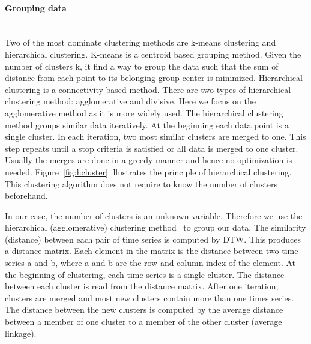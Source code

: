 \paragraph{Grouping data} ~\\
Two of the most dominate clustering methods are k-means clustering and hierarchical clustering. K-means is a centroid based grouping method. Given the number of clusters k, it find a way to group the data such that the sum of distance from each point to its belonging group center is minimized. Hierarchical clustering is a connectivity based method. There are two types of hierarchical clustering method: agglomerative and divisive. Here we focus on the agglomerative method as it is more widely used. The hierarchical clustering method groups similar data iteratively. At the beginning each data point is a single cluster. In each iteration, two most similar clusters are merged to one. This step repeats until a stop criteria is satisfied or all data is merged to one cluster. Usually the merges are done in a greedy manner and hence no optimization is needed. Figure~\ref{fig:hcluster} illustrates the principle of hierarchical clustering. This clustering algorithm does not require to know the number of clusters beforehand.

In our case, the number of clusters is an unknown variable. Therefore we use the hierarchical (agglomerative) clustering method~\cite{willett1988recent} to group our data. The similarity (distance) between each pair of time series is computed by DTW. This produces a distance matrix. Each element in the matrix is the distance between two time series a and b, where a and b are the row and column index of the element. At the beginning of clustering, each time series is a single cluster. The distance between each cluster is read from the distance matrix. After one iteration, clusters are merged and most new clusters contain more than one times series. The distance between the new clusters is computed by the average distance between a member of one cluster to a member of the other cluster (average linkage).

